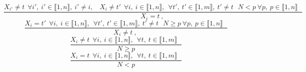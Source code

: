 $$\frac{X_{i'} \neq t~~\forall i',~i' \in \llbracket1,n\rrbracket,~i' \neq i,~~~~X_{i} \neq t'~~\forall i,~i \in \llbracket1,n\rrbracket,~~\forall t',~t' \in \llbracket1,m\rrbracket,~t' \neq t~~~N<p ~\forall p,~p \in \llbracket1,n\rrbracket~~~}{X_{i}=t~,~}$$ $$\frac{X_{i}=t'~~\forall i,~i \in \llbracket1,n\rrbracket,~~\forall t',~t' \in \llbracket1,m\rrbracket,~t' \neq t~~~N \geq p ~\forall p,~p \in \llbracket1,n\rrbracket~~~}{X_{i} \neq t~,~}$$ $$\frac{X_{i} \neq t~~\forall i,~i \in \llbracket1,n\rrbracket,~~\forall t,~t \in \llbracket1,m\rrbracket~~~}{N \geq p }$$ $$\frac{X_{i}=t~~\forall i,~i \in \llbracket1,n\rrbracket,~~\forall t,~t \in \llbracket1,m\rrbracket~~~}{N<p }$$ 